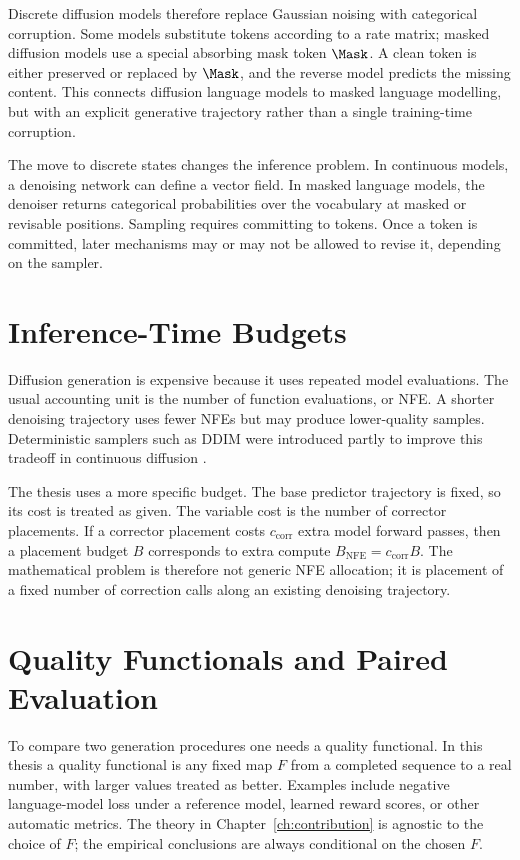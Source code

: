 Discrete diffusion models therefore replace Gaussian noising with categorical
corruption. Some models substitute tokens according to a rate matrix; masked
diffusion models use a special absorbing mask token $\Mask$. A clean token is
either preserved or replaced by $\Mask$, and the reverse model predicts the
missing content. This connects diffusion language models to masked language
modelling, but with an explicit generative trajectory rather than a single
training-time corruption.

The move to discrete states changes the inference problem. In continuous
models, a denoising network can define a vector field. In masked language
models, the denoiser returns categorical probabilities over the vocabulary at
masked or revisable positions. Sampling requires committing to tokens. Once a
token is committed, later mechanisms may or may not be allowed to revise it,
depending on the sampler.

\section{Inference-Time Budgets}
\label{sec:ch2-budgets}

Diffusion generation is expensive because it uses repeated model evaluations.
The usual accounting unit is the number of function evaluations, or NFE. A
shorter denoising trajectory uses fewer NFEs but may produce lower-quality
samples. Deterministic samplers such as DDIM were introduced partly to improve
this tradeoff in continuous diffusion \parencite{song2020ddim}.

The thesis uses a more specific budget. The base predictor trajectory is fixed,
so its cost is treated as given. The variable cost is the number of corrector
placements. If a corrector placement costs $c_{\mathrm{corr}}$ extra model
forward passes, then a placement budget $B$ corresponds to extra compute
$B_{\mathrm{NFE}} = c_{\mathrm{corr}}B$. The mathematical problem is therefore
not generic NFE allocation; it is placement of a fixed number of correction
calls along an existing denoising trajectory.

\section{Quality Functionals and Paired Evaluation}
\label{sec:ch2-quality}

To compare two generation procedures one needs a quality functional. In this
thesis a quality functional is any fixed map $F$ from a completed sequence to a
real number, with larger values treated as better. Examples include negative
language-model loss under a reference model, learned reward scores, or other
automatic metrics. The theory in Chapter~\ref{ch:contribution} is agnostic to
the choice of $F$; the empirical conclusions are always conditional on the
chosen $F$.

